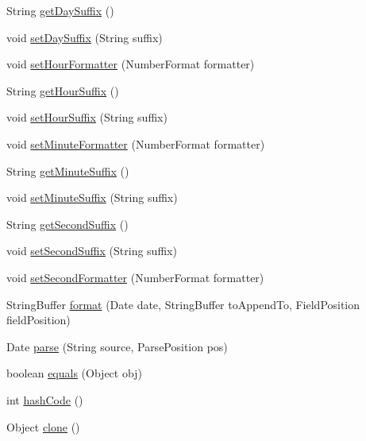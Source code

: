 \begin{DoxyCompactItemize}
\item 
String \mbox{\hyperlink{classorg_1_1jfree_1_1chart_1_1util_1_1_relative_date_format_a5f84a554de33a518de2257c9bc00128c}{get\+Day\+Suffix}} ()
\item 
void \mbox{\hyperlink{classorg_1_1jfree_1_1chart_1_1util_1_1_relative_date_format_ad7cc844d314d44b4430cc8f14f8e1063}{set\+Day\+Suffix}} (String suffix)
\item 
void \mbox{\hyperlink{classorg_1_1jfree_1_1chart_1_1util_1_1_relative_date_format_a86b86b17869735b9fa80d1b6f4315601}{set\+Hour\+Formatter}} (Number\+Format formatter)
\item 
String \mbox{\hyperlink{classorg_1_1jfree_1_1chart_1_1util_1_1_relative_date_format_aa2ed5b91f1be19847c95c52d6a0d43a8}{get\+Hour\+Suffix}} ()
\item 
void \mbox{\hyperlink{classorg_1_1jfree_1_1chart_1_1util_1_1_relative_date_format_a3da1b648d57154883d335a57e01b43bd}{set\+Hour\+Suffix}} (String suffix)
\item 
void \mbox{\hyperlink{classorg_1_1jfree_1_1chart_1_1util_1_1_relative_date_format_a4ac6f1fa5839cc73bdeedc14d5e13c1a}{set\+Minute\+Formatter}} (Number\+Format formatter)
\item 
String \mbox{\hyperlink{classorg_1_1jfree_1_1chart_1_1util_1_1_relative_date_format_a9ee421e346664b3818e87c62d637e1f5}{get\+Minute\+Suffix}} ()
\item 
void \mbox{\hyperlink{classorg_1_1jfree_1_1chart_1_1util_1_1_relative_date_format_af5699d455b828c1b1f9dc67eabe64d7c}{set\+Minute\+Suffix}} (String suffix)
\item 
String \mbox{\hyperlink{classorg_1_1jfree_1_1chart_1_1util_1_1_relative_date_format_a107f720128aa5e6b20d710a5ea227c09}{get\+Second\+Suffix}} ()
\item 
void \mbox{\hyperlink{classorg_1_1jfree_1_1chart_1_1util_1_1_relative_date_format_a732eb727053796caca6b610b36f95868}{set\+Second\+Suffix}} (String suffix)
\item 
void \mbox{\hyperlink{classorg_1_1jfree_1_1chart_1_1util_1_1_relative_date_format_a202f78b80ea6d402f84f5bb0ba87bc90}{set\+Second\+Formatter}} (Number\+Format formatter)
\item 
String\+Buffer \mbox{\hyperlink{classorg_1_1jfree_1_1chart_1_1util_1_1_relative_date_format_a4d52c2bd8c73f5e904e72205d6e46247}{format}} (Date date, String\+Buffer to\+Append\+To, Field\+Position field\+Position)
\item 
Date \mbox{\hyperlink{classorg_1_1jfree_1_1chart_1_1util_1_1_relative_date_format_a40d4787b658f06db339b14eeeb771d0b}{parse}} (String source, Parse\+Position pos)
\item 
boolean \mbox{\hyperlink{classorg_1_1jfree_1_1chart_1_1util_1_1_relative_date_format_a36cc0286be133e34059869277068f58c}{equals}} (Object obj)
\item 
int \mbox{\hyperlink{classorg_1_1jfree_1_1chart_1_1util_1_1_relative_date_format_a5a2a76349ac769f511ba904caca78560}{hash\+Code}} ()
\item 
Object \mbox{\hyperlink{classorg_1_1jfree_1_1chart_1_1util_1_1_relative_date_format_a7ca2a4271960653c5a614859526419fd}{clone}} ()
\end{DoxyCompactItemize}


